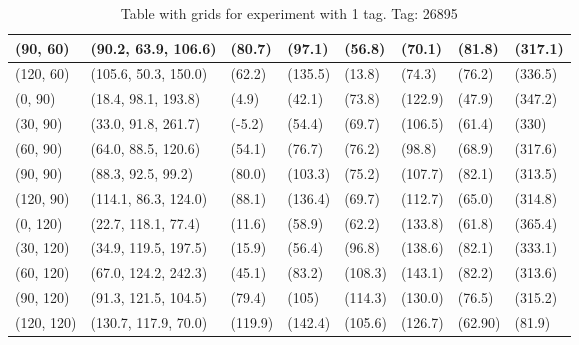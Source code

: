 \begin{table}[H]
\begin{tabular}{|l|l|l|l|l|l|l|l|}
    (90, 60)    & (90.2, 63.9, 106.6)   & (80.7)  & (97.1)  & (56.8)   & (70.1)  & (81.8)  & (317.1)  \\ \hline
    (120, 60)   & (105.6, 50.3, 150.0)  & (62.2)  & (135.5) & (13.8)   & (74.3)  & (76.2)  & (336.5)  \\ \hline
    (0, 90)     & (18.4, 98.1, 193.8)   & (4.9)   & (42.1)  & (73.8)   & (122.9) & (47.9)  & (347.2)  \\ \hline
    (30, 90)    & (33.0, 91.8, 261.7)   & (-5.2)  & (54.4)  & (69.7)   & (106.5) & (61.4)  & (330)    \\ \hline
    (60, 90)    & (64.0, 88.5, 120.6)   & (54.1)  & (76.7)  & (76.2)   & (98.8)  & (68.9)  & (317.6)  \\ \hline
    (90, 90)    & (88.3,  92.5, 99.2)   & (80.0)  & (103.3) & (75.2)   & (107.7) & (82.1)  & (313.5)  \\ \hline
    (120, 90)   & (114.1, 86.3, 124.0)  & (88.1)  & (136.4) & (69.7)   & (112.7) & (65.0)  & (314.8)  \\ \hline
    (0, 120)    & (22.7, 118.1, 77.4)   & (11.6)  & (58.9)  & (62.2)   & (133.8) & (61.8)  & (365.4)  \\ \hline
    (30, 120)   & (34.9, 119.5, 197.5)  & (15.9)  & (56.4)  & (96.8)   & (138.6) & (82.1)  & (333.1)  \\ \hline
    (60, 120)   & (67.0, 124.2, 242.3)  & (45.1)  & (83.2)  & (108.3)  & (143.1) & (82.2)  & (313.6)  \\ \hline
    (90, 120)   & (91.3, 121.5, 104.5)  & (79.4)  & (105)   & (114.3)  & (130.0) & (76.5)  & (315.2)  \\ \hline
    (120, 120)  & (130.7, 117.9, 70.0)  & (119.9) & (142.4) & (105.6)  & (126.7) & (62.90) & (81.9)    \\ \hline
\end{tabular}
\label{Tab:one-tag-experiment-result}
\caption{Table with grids for experiment with 1 tag. Tag: 26895}
\end{table}

